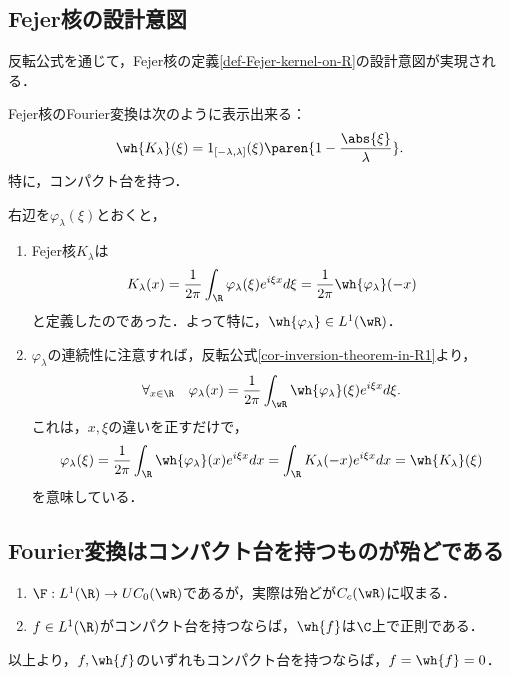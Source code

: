 \documentclass[uplatex,dvipdfmx]{jsreport}
\begin{document}
\subsection{Fejer核の設計意図}

\begin{tcolorbox}[colframe=ForestGreen, colback=ForestGreen!10!white,breakable,colbacktitle=ForestGreen!40!white,coltitle=black,fonttitle=\bfseries\sffamily,
title=]
    反転公式を通じて，Fejer核の定義\ref{def-Fejer-kernel-on-R}の設計意図が実現される．
\end{tcolorbox}

\begin{corollary}[Fejer核のFourier変換]\label{cor-Fourier-transform-of-Fejer-kernel}
    Fejer核のFourier変換は次のように表示出来る：
    \[\wh{K_\lambda}(\xi)=1_{[-\lambda,\lambda]}(\xi)\paren{1-\frac{\abs{\xi}}{\lambda}}.\]
    特に，コンパクト台を持つ．
\end{corollary}
\begin{Proof}
    右辺を$\varphi_\lambda(\xi)$とおくと，
    \begin{enumerate}
        \item Fejer核$K_\lambda$は
        \[K_\lambda(x)=\frac{1}{2\pi}\int_\R\varphi_\lambda(\xi)e^{i\xi x}d\xi=\frac{1}{2\pi}\wh{\varphi_\lambda}(-x)\]
        と定義したのであった．よって特に，$\wh{\varphi_\lambda}\in L^1(\wR)$．
        \item $\varphi_\lambda$の連続性に注意すれば，反転公式\ref{cor-inversion-theorem-in-R1}より，
        \[\forall_{x\in\R}\quad\varphi_\lambda(x)=\frac{1}{2\pi}\int_{\wR}\wh{\varphi_\lambda}(\xi)e^{i\xi x}d\xi.\]
        これは，$x,\xi$の違いを正すだけで，
        \[\varphi_\lambda(\xi)=\frac{1}{2\pi}\int_\R\wh{\varphi_\lambda}(x)e^{i\xi x}dx=\int_\R K_\lambda(-x)e^{i\xi x}dx=\wh{K_\lambda}(\xi)\]
        を意味している．
    \end{enumerate}
\end{Proof}

\subsection{Fourier変換はコンパクト台を持つものが殆どである}

\begin{tcolorbox}[colframe=ForestGreen, colback=ForestGreen!10!white,breakable,colbacktitle=ForestGreen!40!white,coltitle=black,fonttitle=\bfseries\sffamily,
title=]
    \begin{enumerate}
        \item $\F:L^1(\R)\to UC_0(\wR)$であるが，実際は殆どが$C_c(\wR)$に収まる．
        \item $f\in L^1(\R)$がコンパクト台を持つならば，$\wh{f}$は$\C$上で正則である．
    \end{enumerate}
    以上より，$f,\wh{f}$のいずれもコンパクト台を持つならば，$f=\wh{f}=0$．
\end{tcolorbox}
\end{document}
